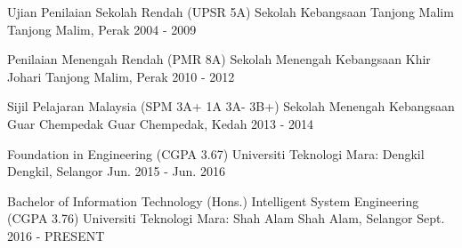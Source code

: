 

\begin{cventries}


\cventry
  {Ujian Penilaian Sekolah Rendah (UPSR 5A)}
  {Sekolah Kebangsaan Tanjong Malim}
  {Tanjong Malim, Perak}
  {2004 - 2009}
  {}

\cventry
  {Penilaian Menengah Rendah (PMR 8A)}
  {Sekolah Menengah Kebangsaan Khir Johari}
  {Tanjong Malim, Perak}
  {2010 - 2012}
  {}
  
 \cventry
  {Sijil Pelajaran Malaysia (SPM 3A+ 1A 3A- 3B+)}
  {Sekolah Menengah Kebangsaan Guar Chempedak}
  {Guar Chempedak, Kedah}
  {2013 - 2014}
  {}

\cventry
  {Foundation in Engineering (CGPA 3.67)}
  {Universiti Teknologi Mara: Dengkil}
  {Dengkil, Selangor}
  {Jun. 2015 - Jun. 2016}
  {}

  \cventry
  {Bachelor of Information Technology (Hons.) Intelligent System Engineering (CGPA 3.76)}
  {Universiti Teknologi Mara: Shah Alam}
  {Shah Alam, Selangor}
  {Sept. 2016 - PRESENT}
  {}

\end{cventries}
